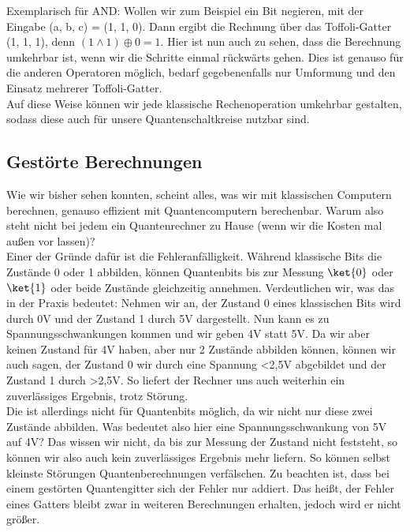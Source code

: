 Exemplarisch für AND: Wollen wir zum Beispiel ein Bit negieren, mit der Eingabe (a, b, c) = (1, 1, 0).
Dann ergibt die Rechnung über das Toffoli-Gatter (1, 1, 1), denn $(1\land 1) \oplus 0 = 1$.
Hier ist nun auch zu sehen, dass die Berechnung umkehrbar ist, wenn wir die Schritte einmal rückwärts gehen.
Dies ist genauso für die anderen Operatoren möglich, bedarf gegebenenfalls nur Umformung und den Einsatz mehrerer Toffoli-Gatter.\\

Auf diese Weise können wir jede klassische Rechenoperation umkehrbar gestalten, sodass diese auch für unsere Quantenschaltkreise nutzbar sind.\\


\subsection{Gestörte Berechnungen}
\label{subsec:gestoerte-berechnungen}

Wie wir bisher sehen konnten, scheint alles, was wir mit klassischen Computern berechnen, genauso effizient mit Quantencomputern berechenbar.
Warum also steht nicht bei jedem ein Quantenrechner zu Hause (wenn wir die Kosten mal außen vor lassen)?\\

Einer der Gründe dafür ist die Fehleranfälligkeit.
Während klassische Bits die Zustände 0 oder 1 abbilden, können Quantenbits bis zur Messung $\ket{0}$ oder $\ket{1}$ oder beide Zustände gleichzeitig annehmen.
Verdeutlichen wir, was das in der Praxis bedeutet: Nehmen wir an, der Zustand 0 eines klassischen Bits wird durch 0V und der Zustand 1 durch 5V dargestellt.
Nun kann es zu Spannungsschwankungen kommen und wir geben 4V statt 5V\@.
Da wir aber keinen Zustand für 4V haben, aber nur 2 Zustände abbilden können, können wir auch sagen, der Zustand 0 wir durch eine Spannung <2,5V abgebildet und der Zustand 1 durch >2,5V.
So liefert der Rechner uns auch weiterhin ein zuverlässiges Ergebnis, trotz Störung.\\

Die ist allerdings nicht für Quantenbits möglich, da wir nicht nur diese zwei Zustände abbilden.
Was bedeutet also hier eine Spannungsschwankung von 5V auf 4V?
Das wissen wir nicht, da bis zur Messung der Zustand nicht feststeht, so können wir also auch kein zuverlässiges Ergebnis mehr liefern.
So können selbst kleinste Störungen Quantenberechnungen verfälschen.
Zu beachten ist, dass bei einem gestörten Quantengitter sich der Fehler nur addiert.
Das heißt, der Fehler eines Gatters bleibt zwar in weiteren Berechnungen erhalten, jedoch wird er nicht größer.\\

